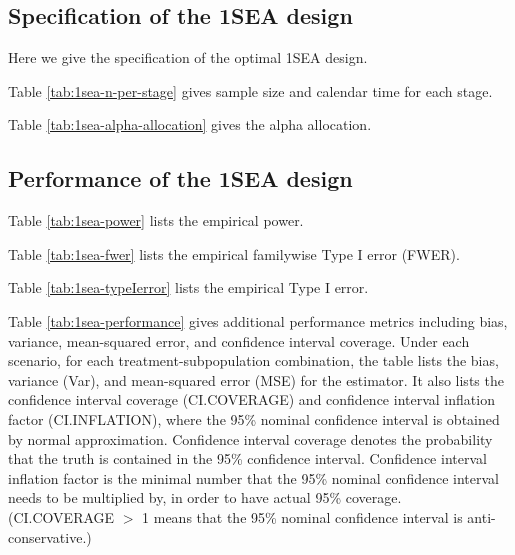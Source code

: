 \documentclass{article}\usepackage[]{graphicx}\usepackage[]{color}
\makeatletter
\newenvironment{kframe}{%
 \def\at@end@of@kframe{}%
 \ifinner\ifhmode%
  \def\at@end@of@kframe{\end{minipage}}%
  \begin{minipage}{\columnwidth}%
 \fi\fi%
 \def\FrameCommand##1{\hskip\@totalleftmargin \hskip-\fboxsep
 \colorbox{shadecolor}{##1}\hskip-\fboxsep
     \hskip-\linewidth \hskip-\@totalleftmargin \hskip\columnwidth}%
 \MakeFramed {\advance\hsize-\width
   \@totalleftmargin\z@ \linewidth\hsize
   \@setminipage}}%
 {\par\unskip\endMakeFramed%
 \at@end@of@kframe}
\numberwithin{table}{section}
\numberwithin{figure}{section}
\makeatother
\begin{document}
\subsection{Specification of the 1SEA design}

Here we give the specification of the optimal 1SEA design.

Table \ref{tab:1sea-n-per-stage} gives sample size and calendar time for each stage.

Table \ref{tab:1sea-alpha-allocation} gives the alpha allocation.


\begin{kframe}


{\ttfamily\noindent\bfseries\color{errorcolor}{\#\# Error in data.frame(Stage = 1:nrow(my.table), my.table): arguments imply differing number of rows: 2, 0}}\end{kframe}

\begin{kframe}


{\ttfamily\noindent\bfseries\color{errorcolor}{\#\# Error in data.frame(Stage = 1:nrow(alpha.allocation), alpha.allocation): arguments imply differing number of rows: 2, 0}}\end{kframe}


\subsection{Performance of the 1SEA design}


Table \ref{tab:1sea-power} lists the empirical power.

Table \ref{tab:1sea-fwer} lists the empirical familywise Type I error (FWER).

Table \ref{tab:1sea-typeIerror} lists the empirical Type I error.

Table \ref{tab:1sea-performance} gives additional performance metrics including bias, variance, mean-squared error, and confidence interval coverage. Under each scenario, for each treatment-subpopulation combination, the table lists the bias, variance (Var), and mean-squared error (MSE) for the estimator. It also lists the confidence interval coverage (CI.COVERAGE) and confidence interval inflation factor (CI.INFLATION), where the 95\% nominal confidence interval is obtained by normal approximation. Confidence interval coverage denotes the probability that the truth is contained in the 95\% confidence interval. Confidence interval inflation factor is the minimal number that the 95\% nominal confidence interval needs to be multiplied by, in order to have actual 95\% coverage. (CI.COVERAGE $>$ 1 means that the 95\% nominal confidence interval is anti-conservative.)
\end{document}
